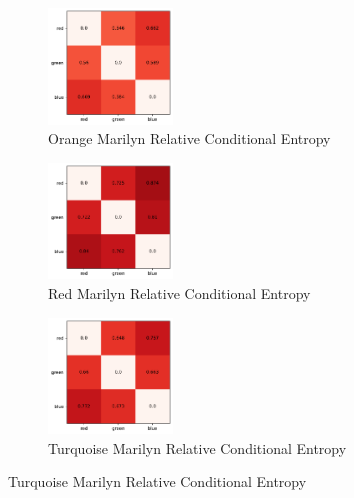 \documentclass{article}
\begin{document}
\begin{figure}[ht]
  \centering
  \begin{subfigure}{0.3\textwidth}
    \centering
    \includegraphics[width=125px]{main_files/figure-latex/3_1_orange_marilyn_entropy.pdf}
    \caption{Orange Marilyn Relative Conditional Entropy}
    \label{fig:3_1_orange_marilyn_entropy}
  \end{subfigure}
  \hfill
  \begin{subfigure}{0.3\textwidth}
    \centering
    \includegraphics[width=125px]{main_files/figure-latex/3_2_red_marilyn_entropy.pdf}
    \caption{Red Marilyn Relative Conditional Entropy}
    \label{fig:3_2_red_marilyn_entropy}
  \end{subfigure}
  \hfill
  \begin{subfigure}{0.3\textwidth}
    \centering
    \includegraphics[width=125px]{main_files/figure-latex/3_3_turq_marilyn_entropy.pdf}
    \caption{Turquoise Marilyn Relative Conditional Entropy}
    \label{fig:3_3_turq_marilyn_entropy}
  \end{subfigure}

  \vspace{1em} %


\end{figure}
\end{document}
